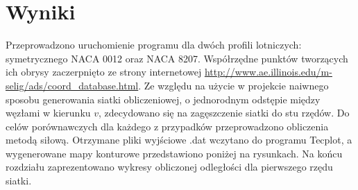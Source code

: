 \chapter{Wyniki}

\indent\indent Przeprowadzono uruchomienie programu dla dwóch profili lotniczych: symetrycznego \textsf{NACA 0012} oraz \textsf{NACA 8207}. Współrzędne punktów tworzących ich obrysy zaczerpnięto ze strony internetowej \url{http://www.ae.illinois.edu/m-selig/ads/coord_database.html}. Ze względu na użycie w projekcie naiwnego sposobu generowania siatki obliczeniowej, o jednorodnym odstępie między węzłami w kierunku $v$, zdecydowano się na zagęszczenie siatki do stu rzędów. Do celów porównawczych dla każdego z przypadków przeprowadzono obliczenia metodą siłową. Otrzymane pliki wyjściowe \textsf{.dat} wczytano do programu \textsf{Tecplot}, a wygenerowane mapy konturowe przedstawiono poniżej na rysunkach. Na końcu rozdziału zaprezentowano wykresy obliczonej odległości dla pierwszego rzędu siatki.

